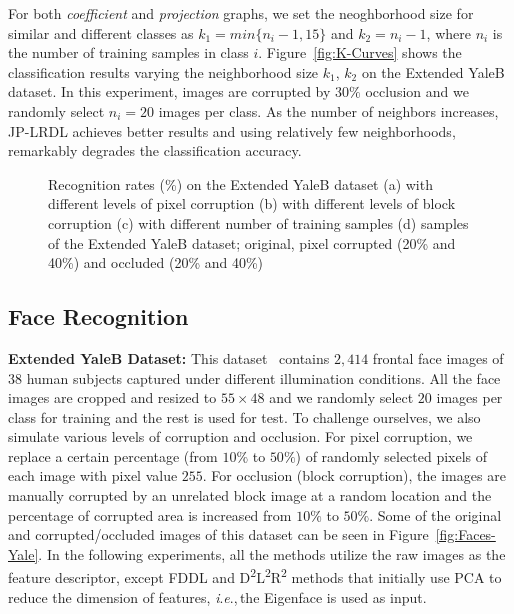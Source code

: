 \documentclass[journal]{IEEEtran}
\newcommand{\ie}{\textit{i}.\textit{e}.,\,}
\begin{document}
For both \textit{coefficient} and \textit{projection} graphs, we set the neoghborhood size for similar and different classes as $k_1 = min\{n_{i}-1,15\}$ and $k_2=n_i-1$, where $n_i$ is the number of training samples in class $i$. Figure~\ref{fig:K-Curves} shows the classification results varying the neighborhood size $k_1$, $k_2$ on the Extended YaleB dataset. In this experiment, images are corrupted by $30\%$ occlusion and we randomly select $n_i = 20$ images per class. As the number of neighbors increases, JP-LRDL achieves better results and using relatively few neighborhoods, remarkably degrades the classification accuracy.
\begin{figure}[t]
\centering
{}  
\hspace{2pt}
\vspace{0.2em}
\caption{Recognition rates (\%) on the Extended YaleB dataset (a) with different levels of pixel corruption (b) with different levels of block corruption (c) with different number of training samples (d) samples of the Extended YaleB dataset; original, pixel corrupted (20\% and 40\%) and occluded (20\% and 40\%)}
\vspace{-1.5em}
\end{figure} 
\subsection{Face Recognition}
\textbf{Extended YaleB Dataset:} This dataset~\cite{Yale} contains $2,414$ frontal face images of $38$ human subjects captured under different illumination conditions. All the face images are cropped and resized to $55 \times 48$ and we randomly select $20$ images per class for training and the rest is used for test. To challenge ourselves, we also simulate various levels of corruption and occlusion. For pixel corruption, we replace a certain percentage (from $10\%$ to $50\%$) of randomly selected pixels of each image with pixel value $255$. For occlusion (block corruption), the images are manually corrupted by an unrelated block image at a random location and the percentage of corrupted area is increased from $10\%$ to $50\%$. Some of the original and corrupted/occluded images of this dataset can be seen in Figure~\ref{fig:Faces-Yale}. In the following experiments, all the methods utilize the raw images as the feature descriptor, except FDDL and D\textsuperscript{2}L\textsuperscript{2}R\textsuperscript{2} methods that initially use PCA to reduce the dimension of features, \ie the Eigenface is used as input.
\end{document}
